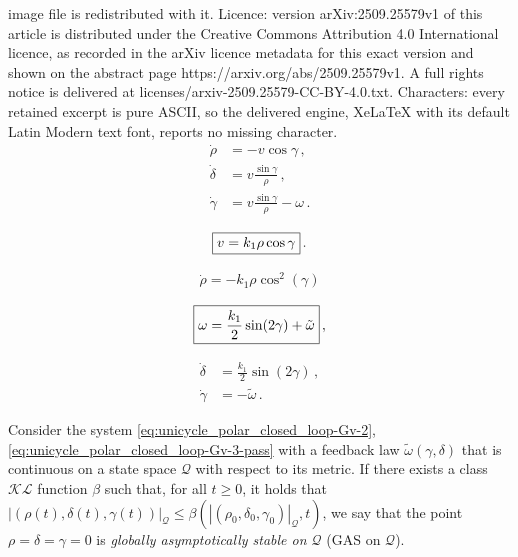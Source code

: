 \documentclass[10pt,a4paper]{amsart}
\begin{document}
image file is redistributed with it. Licence: version arXiv:2509.25579v1 of this article is distributed under the Creative Commons Attribution 4.0 International licence, as recorded in the arXiv licence metadata for this exact version and shown on the abstract page https://arxiv.org/abs/2509.25579v1. A full rights notice is delivered at licenses/arxiv-2509.25579-CC-BY-4.0.txt. Characters: every retained excerpt is pure ASCII, so the delivered engine, XeLaTeX with its default Latin Modern text font, reports no missing character.
\begin{subequations}\label{eq:unicycle_polar_closed_loop-Gv-1}
    \begin{align}
    \dot{\rho} &= 
    -v \cos\gamma \,, \label{eq:unicycle_polar_rhodot}\\
    \dot{\delta} &= v  \frac{\sin\gamma}{\rho}\,, \label{eq:unicycle_polar_deltadot}\\
    \dot{\gamma} &= v \frac{\sin\gamma}{\rho} -\omega  \label{eq:unicycle_polar_gammadot} \,.
    \end{align} 
\end{subequations}

\begin{equation}
\label{eq-basic-v-control}
\fbox{$v = k_1 \rho \cos\gamma$} \,.
\end{equation}

\begin{align}
\label{eq:unicycle_polar_closed_loop-Gv-2}
\dot{\rho} = - k_1 \rho \cos^2(\gamma)
\end{align}

\begin{equation}
\label{eq-omega-general}
\fbox{$\omega = \dfrac{k_1}{2} \sin(2\gamma) + \tilde\omega$} \,,
\end{equation}

\begin{subequations}
\label{eq:unicycle_polar_closed_loop-Gv-3-pass}
\begin{align}
\dot{\delta} &= \frac{k_1}{2} \sin(2\gamma)\,, \label{eq:unicycle_polar_closed_loop-Gv-3n-pass} \\
\dot{\gamma} &= -\tilde\omega \label{eq:unicycle_polar_closed_loop-Gv-3a-pass}\,.
\end{align}
\end{subequations}

\begin{definition}
\label{def-our-GAS}
Consider the system \eqref{eq:unicycle_polar_closed_loop-Gv-2}, \eqref{eq:unicycle_polar_closed_loop-Gv-3-pass} with a feedback law $\tilde\omega(\gamma,\delta)$ that is continuous on a state space $\mathcal{Q}$ with respect to its metric. 
If there exists a class $\mathcal{KL}$ function $\beta$ such that, for all $t\geq 0$, it holds that $|(\rho(t),\delta(t), \gamma(t))|_{\mathcal{Q}}\leq \beta\left(|(\rho_0,\delta_0, \gamma_0)|_{\mathcal{Q}},t\right)$, we say that the 
point $\rho=\delta = \gamma=0$ is {\em globally asymptotically stable on $\mathcal{Q}$} (GAS on $\mathcal{Q}$). 
\end{definition}
\end{document}
